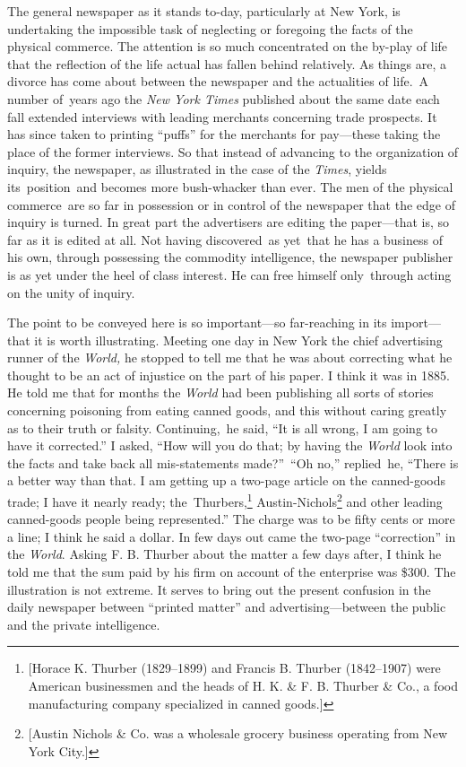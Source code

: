 \documentclass[openany,nobib]{tufte-book}
\begin{document}
The general newspaper as it stands to-day, particularly at New York, is
undertaking the impossible task of neglecting or foregoing the facts of
the physical commerce. The attention is so much concentrated on the
by-play of life that the reflection of the life actual has fallen behind
relatively. As things are, a divorce has come about between the
newspaper and the actualities of life.~A number of~years ago the
\emph{New York Times} published about the same date each fall extended
interviews with leading merchants concerning trade prospects. It has
since taken to printing ``puffs'' for the merchants for pay---these
taking the place of the former interviews. So that instead of advancing
to the organization of inquiry, the newspaper, as illustrated in the
case of the \emph{Times}, yields its~position~and becomes more
bush-whacker than ever. The men of the physical commerce~are so far in
possession or in control of the newspaper that the edge of inquiry is
turned. In great part the advertisers are editing the paper---that is,
so far as it is edited at all. Not having discovered~as yet~that he has
a business of his own, through possessing the commodity intelligence,
the newspaper publisher is as yet under the heel of class interest. He
can free himself only~through acting on the unity of inquiry.~

The point to be conveyed here is so important---so far-reaching in its
import---that it is worth illustrating. Meeting one day in New York the
chief advertising runner of the \emph{World,} he stopped to tell me that
he was about correcting what he thought to be an act of injustice on the
part of his paper. I think it was in 1885. He told me that for months
the \emph{World} had been publishing all sorts of stories concerning
poisoning from eating canned goods, and this without caring greatly as
to their truth or falsity. Continuing,~he said, ``It is all wrong, I am
going to have it corrected.'' I asked, ``How will you do that; by having
the \emph{World} look into the facts and take back all mis-statements
made?''~``Oh no,'' replied~he, ``There is a better way than that. I am
getting up a two-page article on the canned-goods trade; I have it
nearly ready; the~Thurbers,\footnote{{[}Horace K. Thurber (1829--1899)
  and Francis B. Thurber (1842--1907) were American businessmen and the
  heads of H. K. \& F. B. Thurber \& Co., a food manufacturing company
  specialized in canned goods.{]}} Austin-Nichols\footnote{{[}Austin
  Nichols \& Co. was a wholesale grocery business operating from New
  York City.{]}} and other leading canned-goods people being
represented.'' The charge was to be fifty cents or more a line; I think
he said a dollar. In few days out came the two-page ``correction'' in
the \emph{World}. Asking F. B. Thurber about the matter a few days
after, I think he told me that the sum paid by his firm on account of
the enterprise was \$300. The illustration is not extreme. It serves to
bring out the present confusion in the daily newspaper between ``printed
matter'' and advertising---between the public and the private
intelligence.~
\end{document}

